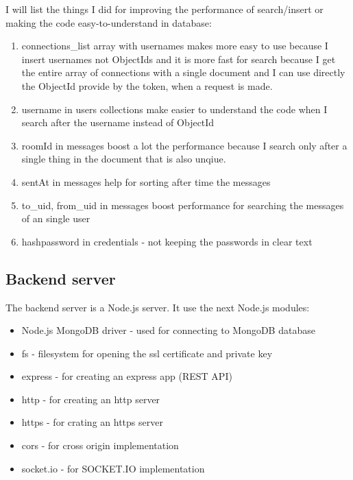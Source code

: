 I will list the things I did for improving the performance of search/insert or making the code easy-to-understand in database:
\begin{enumerate}
    \item connections_list array with usernames makes more easy to use because I insert usernames not ObjectIds and it is more fast
    for search because I get the entire array of connections with a single document and I can use directly the ObjectId provide
    by the token, when a request is made.
    \item username in users collections make easier to understand the code when I search after the username instead of ObjectId
    \item roomId in messages boost a lot the performance because I search only after a single thing in the document that is also unqiue.
    \item sentAt in messages help for sorting after time the messages
    \item to_uid, from_uid in messages boost performance for searching the messages of an single user
    \item hashpassword in credentials - not keeping the passwords in clear text
\end{enumerate}


\subsection{Backend server}
\label{sub-sec:implementation-callapp-backend}

The backend server is a Node.js server. It use the next Node.js modules:
\begin{itemize}
    \item Node.js MongoDB driver - used for connecting to MongoDB database
    \item fs - filesystem for opening the ssl certificate and private key
    \item express - for creating an express app (REST API)
    \item http - for creating an http server
    \item https - for crating an https server
    \item cors - for cross origin implementation
    \item socket.io - for SOCKET.IO implementation
\end{itemize}

